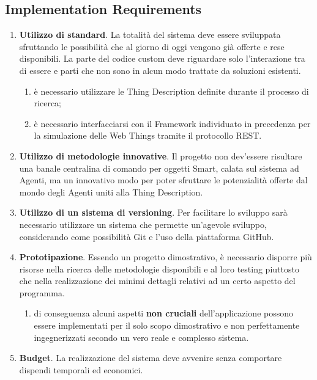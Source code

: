 \documentclass[12pt,a4paper,openright,oneside]{report}
\begin{document}
\subsection{Implementation Requirements}
\begin{enumerate}[label*=\arabic*.]	
	\item \textbf{Utilizzo di standard}. La totalità del sistema deve essere sviluppata sfruttando le possibilità che al giorno di oggi vengono già offerte e rese disponibili. La parte del codice custom deve riguardare solo l'interazione tra di essere e parti che non sono in alcun modo trattate da soluzioni esistenti.
	\begin{enumerate}[label*=\arabic*.]
		\item è necessario utilizzare le Thing Description definite durante il processo di ricerca;
		\item è necessario interfacciarsi con il Framework individuato in precedenza per la simulazione delle Web Things tramite il protocollo REST.
	\end{enumerate}
	
	\item \textbf{Utilizzo di metodologie innovative}. Il progetto non dev'essere risultare una banale centralina di comando per oggetti Smart, calata sul sistema ad Agenti, ma un innovativo modo per poter sfruttare le potenzialità offerte dal mondo degli Agenti uniti alla Thing Description.
	
	\item \textbf{Utilizzo di un sistema di versioning}. Per facilitare lo sviluppo sarà necessario utilizzare un sistema che permette un'agevole sviluppo, considerando come possibilità Git e l'uso della piattaforma GitHub.
	
	\item \textbf{Prototipazione}. Essendo un progetto dimostrativo, è necessario disporre più risorse nella ricerca delle metodologie disponibili e al loro testing piuttosto che nella realizzazione dei minimi dettagli relativi ad un certo aspetto del programma.
	\begin{enumerate}[label*=\arabic*.]
		\item di conseguenza alcuni aspetti \textbf{non cruciali} dell'applicazione possono essere implementati per il solo scopo dimostrativo e non perfettamente ingegnerizzati secondo un vero reale e complesso sistema.
	\end{enumerate}
	
	\item \textbf{Budget}. La realizzazione del sistema deve avvenire senza comportare dispendi temporali ed economici.
\end{enumerate}
\end{document}
